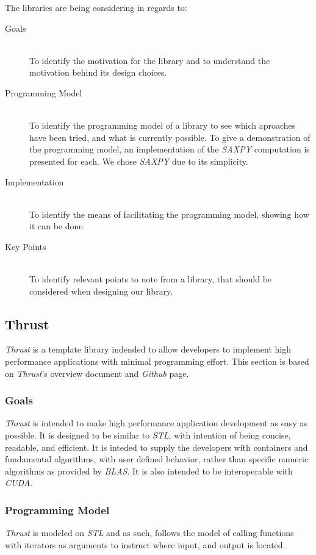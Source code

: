 The libraries are being considering in regards to:
\begin{description}
\item[Goals] \hfill \\
To identify the motivation for the library and to understand the motivation behind its design choices.
\item[Programming Model] \hfill \\
To identify the programming model of a library to see which aproaches have been tried, and what is currently possible. To give a demonstration of the programming model, an implementation of the \textit{SAXPY} computation is presented for each. We chose \textit{SAXPY} due to its simplicity.
\item[Implementation] \hfill \\
To identify the means of facilitating the programming model, showing how it can be done.
\item[Key Points] \hfill \\
To identify relevant points to note from a library, that should be considered when designing our library.
\end{description}

\subsection{Thrust}
\textit{Thrust} is a template library indended to allow developers to implement high performance applications with minimal programming effort. This section is based on \textit{Thrust}'s overview document\cite{thrustOverview} and \textit{Github} page\cite{thrustGithub}.

\subsubsection{Goals}
\textit{Thrust} is intended to make high performance application development as easy as possible. It is designed to be similar to \textit{STL}, with intention of being concise, readable, and efficient. It is inteded to supply the developers with containers and fundamental algorithms, with user defined behavior, rather than specific numeric algorithms as provided by \textit{BLAS}. It is also intended to be interoperable with \textit{CUDA}.

\subsubsection{Programming Model}
\textit{Thrust} is modeled on \textit{STL} and as such, follows the model of calling functions with iterators as arguments to instruct where input, and output is located.

